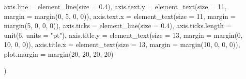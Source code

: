 \documentclass[
  11pt,
]{article}
\newenvironment{Shaded}{\begin{snugshade}}{\end{snugshade}}
\newcommand{\AttributeTok}[1]{\textcolor[rgb]{0.77,0.63,0.00}{#1}}
\newcommand{\DecValTok}[1]{\textcolor[rgb]{0.00,0.00,0.81}{#1}}
\newcommand{\FloatTok}[1]{\textcolor[rgb]{0.00,0.00,0.81}{#1}}
\newcommand{\FunctionTok}[1]{\textcolor[rgb]{0.00,0.00,0.00}{#1}}
\newcommand{\NormalTok}[1]{#1}
\newcommand{\StringTok}[1]{\textcolor[rgb]{0.31,0.60,0.02}{#1}}
\begin{document}
\begin{Shaded}
\begin{Highlighting}[]
    \AttributeTok{axis.line =} \FunctionTok{element\_line}\NormalTok{(}\AttributeTok{size =} \FloatTok{0.4}\NormalTok{),}
    \AttributeTok{axis.text.y =} \FunctionTok{element\_text}\NormalTok{(}\AttributeTok{size =} \DecValTok{11}\NormalTok{, }\AttributeTok{margin =} \FunctionTok{margin}\NormalTok{(}\DecValTok{0}\NormalTok{, }\DecValTok{5}\NormalTok{, }\DecValTok{0}\NormalTok{, }\DecValTok{0}\NormalTok{)),}
    \AttributeTok{axis.text.x =} \FunctionTok{element\_text}\NormalTok{(}\AttributeTok{size =} \DecValTok{11}\NormalTok{, }\AttributeTok{margin =} \FunctionTok{margin}\NormalTok{(}\DecValTok{5}\NormalTok{, }\DecValTok{0}\NormalTok{, }\DecValTok{0}\NormalTok{, }\DecValTok{0}\NormalTok{)),}
    \AttributeTok{axis.ticks =} \FunctionTok{element\_line}\NormalTok{(}\AttributeTok{size =} \FloatTok{0.4}\NormalTok{),}
    \AttributeTok{axis.ticks.length =} \FunctionTok{unit}\NormalTok{(}\DecValTok{6}\NormalTok{, }\AttributeTok{units =} \StringTok{"pt"}\NormalTok{),}
    \AttributeTok{axis.title.y =} \FunctionTok{element\_text}\NormalTok{(}\AttributeTok{size =} \DecValTok{13}\NormalTok{, }\AttributeTok{margin =} \FunctionTok{margin}\NormalTok{(}\DecValTok{0}\NormalTok{, }\DecValTok{10}\NormalTok{, }\DecValTok{0}\NormalTok{, }\DecValTok{0}\NormalTok{)),}
    \AttributeTok{axis.title.x =} \FunctionTok{element\_text}\NormalTok{(}\AttributeTok{size =} \DecValTok{13}\NormalTok{, }\AttributeTok{margin =} \FunctionTok{margin}\NormalTok{(}\DecValTok{10}\NormalTok{, }\DecValTok{0}\NormalTok{, }\DecValTok{0}\NormalTok{, }\DecValTok{0}\NormalTok{)),}
    \AttributeTok{plot.margin =} \FunctionTok{margin}\NormalTok{(}\DecValTok{20}\NormalTok{, }\DecValTok{20}\NormalTok{, }\DecValTok{20}\NormalTok{, }\DecValTok{20}\NormalTok{)}

\NormalTok{  )}
\end{Highlighting}
\end{Shaded}
\end{document}
